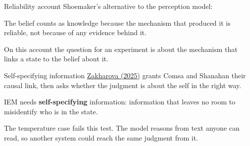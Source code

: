 \documentclass[aspectratio=169,11pt]{beamer}
\begin{document}
\begin{frame}[label=reliab]{Reliability account}
Shoemaker's alternative to the perception model:

\vspace{0.6em}
\begin{center}
\end{center}

\vspace{0.6em}
The belief counts as knowledge because the mechanism that produced it is reliable, not because of any evidence behind it.

\vspace{0.4em}
{\small On this account the question for an experiment is about the mechanism that links a state to the belief about it.}
\end{frame}

\begin{frame}[label=selfspec]{Self-specifying information}
\href{https://philarchive.org/rec/ZAKMTS}{Zakharova (2025)} grants Comsa and Shanahan their causal link, then asks whether the judgment is about the self in the right way.

\vspace{0.4em}
{\small IEM needs \textbf{self-specifying} information: information that leaves no room to misidentify who is in the state.}

\vspace{0.2em}
\begin{center}
\end{center}

{\small The temperature case fails this test. The model reasons from text anyone can read, so another system could reach the same judgment from it.}
\end{frame}
\end{document}
